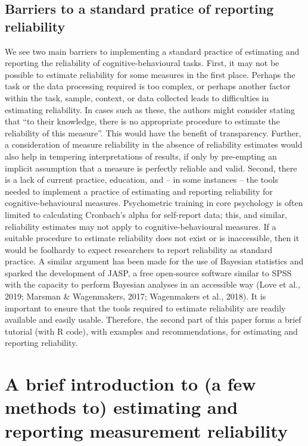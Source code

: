 \documentclass[english,,man,floatsintext]{apa6}
\begin{document}
\hypertarget{barriers-to-a-standard-pratice-of-reporting-reliability}{%
\subsection{Barriers to a standard pratice of reporting reliability}\label{barriers-to-a-standard-pratice-of-reporting-reliability}}

We see two main barriers to implementing a standard practice of estimating and reporting the reliability of cognitive-behavioural tasks. First, it may not be possible to estimate reliability for some measures in the first place. Perhaps the task or the data processing required is too complex, or perhaps another factor within the task, sample, context, or data collected leads to difficulties in estimating reliability. In cases such as these, the authors might consider stating that \enquote{to their knowledge, there is no appropriate procedure to estimate the reliability of this measure}. This would have the benefit of transparency. Further, a consideration of measure reliability in the absence of reliability estimates would also help in tempering interpretations of results, if only by pre-empting an implicit assumption that a measure is perfectly reliable and valid. Second, there is a lack of current practice, education, and -- in some instances -- the tools needed to implement a practice of estimating and reporting reliability for cognitive-behavioural measures. Psychometric training in core psychology is often limited to calculating Cronbach's alpha for self-report data; this, and similar, reliability estimates may not apply to cognitive-behavioural measures. If a suitable procedure to estimate reliability does not exist or is inaccessible, then it would be foolhardy to expect researchers to report reliability as standard practice. A similar argument has been made for the use of Bayesian statistics and sparked the development of JASP, a free open-source software similar to SPSS with the capacity to perform Bayesian analyses in an accessible way (Love et al., 2019; Marsman \& Wagenmakers, 2017; Wagenmakers et al., 2018). It is important to ensure that the tools required to estimate reliability are readily available and easily usable. Therefore, the second part of this paper forms a brief tutorial (with R code), with examples and recommendations, for estimating and reporting reliability.

\hypertarget{a-brief-introduction-to-a-few-methods-to-estimating-and-reporting-measurement-reliability}{%
\section{A brief introduction to (a few methods to) estimating and reporting measurement reliability}\label{a-brief-introduction-to-a-few-methods-to-estimating-and-reporting-measurement-reliability}}
\end{document}
